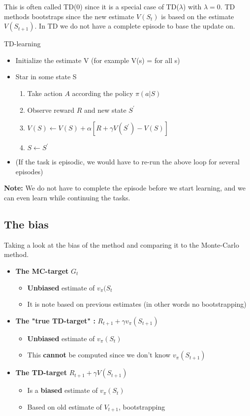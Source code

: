 This is often called TD(0) since it is a special case of TD($\lambda$) with $\lambda = 0$. TD methods bootstraps since the new estimate $V(S_t)$ is based on the estimate $V(S_{t+1})$. In TD we do not have a complete episode to base the update on. 


\begin{wbox}{TD-learning}
\begin{itemize}
	\item Initialize the estimate V (for example V(s) = for all s)
	\item Star in some state S
	\begin{enumerate}
		\item Take action $A$ according the policy $\pi (a|S)$
		\item Observe reward $R$ and new state $S^{\prime}$
		\item $V(S) \leftarrow V(S) + \alpha [R + \gamma V(S^{\prime}) - V(S)]$
		\item $S \leftarrow S^{\prime}$
	\end{enumerate}
	\item (If the task is episodic, we would have to re-run the above loop for several episodes)
\end{itemize}

\textbf{Note: } We do not have to complete the episode before we start learning, and we can even learn while continuing the tasks. 
\end{wbox}

\subsection{The bias}
Taking a look at the bias of the method and comparing it to the Monte-Carlo method. 

\begin{itemize}
	\item \textbf{The MC-target} $G_t$
	\begin{itemize}
		\item \textbf{Unbiased} estimate of $v_\pi(S_t$
		\item It is note based on previous estimates (in other words no bootstrapping)
	\end{itemize}
	\item \textbf{The "true TD-target" : } $R_{t+1} + \gamma v_\pi(S_{t+1})$
	\begin{itemize}
		\item \textbf{Unbiased} estimate of $v_\pi(S_t)$
		\item This \textbf{cannot} be computed since we don't know $v_\pi(S_{t+1})$
	\end{itemize}
	\item \textbf{The TD-target} $R_{t+1} + \gamma V(S_{t+1})$
	\begin{itemize}
		\item Is a \textbf{biased} estimate of  $v_\pi(S_t)$
		\item Based on old estimate of $V_{t+1}$, bootstrapping 
	\end{itemize}
\end{itemize}


